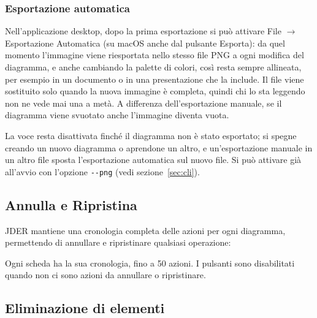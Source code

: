 \documentclass[a4paper,11pt]{article}
\makeatletter
\newcommand\mediumweight{\fontseries{mb}\selectfont}
\newcommand\chipbox[2]{%
  \edef\chipname{chip@#1@\f@size @\detokenize{#2}}%
  \ifcsname\chipname\endcsname\else
    \expandafter\newsavebox\csname\chipname\endcsname
    \global\expandafter\setbox\csname\chipname\endcsname\hbox{\tcbox[#1]{\vphantom{Ag}#2}}%
  \fi
  \expandafter\usebox\csname\chipname\endcsname}
\newcommand\key[1]{\chipbox{m3key}{#1}}
\newcommand\menu[1]{{\mediumweight\color{m3onprimarycontainer}#1}}
\newcommand\uielement[1]{{\mediumweight #1}}
\newcommand\jder{{\mediumweight JDER}}
\makeatother
\begin{document}
\subsubsection{Esportazione automatica}
\label{sec:autoexport}

Nell'applicazione desktop, dopo la prima esportazione si può attivare \menu{File} $\to$
\menu{Esportazione Automatica} (su macOS anche dal pulsante \uielement{Esporta}): da quel momento l'immagine viene riesportata nello
stesso file PNG a ogni modifica del diagramma, e anche cambiando la palette di colori, così resta
sempre allineata, per esempio in un documento o in una presentazione che la include. Il file viene
sostituito solo quando la nuova immagine è completa, quindi chi lo sta leggendo non ne vede mai
una a metà. A differenza dell'esportazione manuale, se il diagramma viene svuotato anche
l'immagine diventa vuota.

La voce resta disattivata finché il diagramma non è stato esportato; si spegne creando un nuovo
diagramma o aprendone un altro, e un'esportazione manuale in un altro file sposta l'esportazione
automatica sul nuovo file. Si può attivare già all'avvio con l'opzione \texttt{-{}-png} (vedi
sezione~\ref{sec:cli}).

\subsection{Annulla e Ripristina}

\jder{} mantiene una cronologia completa delle azioni per ogni diagramma, permettendo di
annullare e ripristinare qualsiasi operazione:


Ogni scheda ha la sua cronologia, fino a 50 azioni. I pulsanti sono disabilitati quando non ci
sono azioni da annullare o ripristinare.

\subsection{Eliminazione di elementi}
\end{document}
